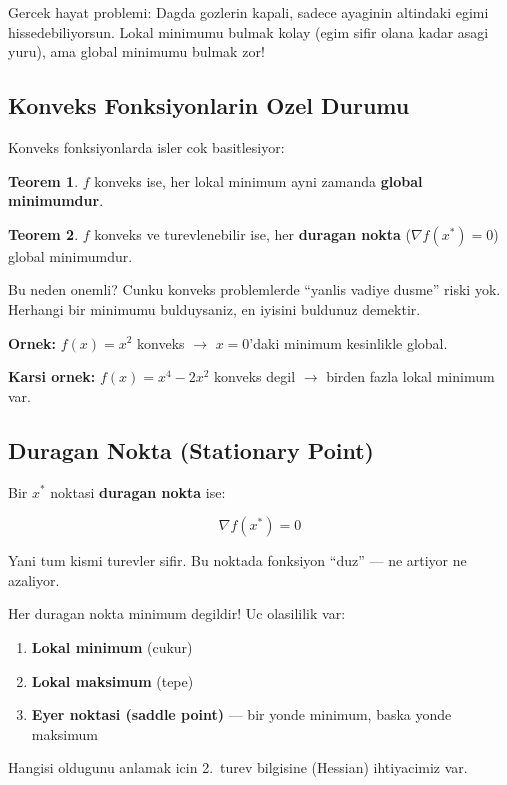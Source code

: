 \documentclass[12pt,a4paper]{article}
\theoremstyle{definition}
\newtheorem{teorem}{Teorem}[section]
\theoremstyle{remark}
\begin{document}
Gercek hayat problemi: Dagda gozlerin kapali, sadece ayaginin altindaki egimi hissedebiliyorsun. Lokal minimumu bulmak kolay (egim sifir olana kadar asagi yuru), ama global minimumu bulmak zor!

\subsection{Konveks Fonksiyonlarin Ozel Durumu}

Konveks fonksiyonlarda isler cok basitlesiyor:

\begin{teorem}
$f$ konveks ise, her lokal minimum ayni zamanda \textbf{global minimumdur}.
\end{teorem}

\begin{teorem}
$f$ konveks ve turevlenebilir ise, her \textbf{duragan nokta} ($\nabla f(x^*) = 0$) global minimumdur.
\end{teorem}

Bu neden onemli? Cunku konveks problemlerde ``yanlis vadiye dusme'' riski yok. Herhangi bir minimumu bulduysaniz, en iyisini buldunuz demektir.

\textbf{Ornek:} $f(x) = x^2$ konveks $\rightarrow$ $x = 0$'daki minimum kesinlikle global.

\textbf{Karsi ornek:} $f(x) = x^4 - 2x^2$ konveks degil $\rightarrow$ birden fazla lokal minimum var.

\subsection{Duragan Nokta (Stationary Point)}

Bir $x^*$ noktasi \textbf{duragan nokta} ise:

\[
\nabla f(x^*) = 0
\]

Yani tum kismi turevler sifir. Bu noktada fonksiyon ``duz'' --- ne artiyor ne azaliyor.

\begin{dikkat}
Her duragan nokta minimum degildir! Uc olasililik var:
\begin{enumerate}[leftmargin=*, itemsep=0.2em]
\item \textbf{Lokal minimum} (cukur)
\item \textbf{Lokal maksimum} (tepe)
\item \textbf{Eyer noktasi (saddle point)} --- bir yonde minimum, baska yonde maksimum
\end{enumerate}
Hangisi oldugunu anlamak icin 2.\ turev bilgisine (Hessian) ihtiyacimiz var.
\end{dikkat}
\end{document}
